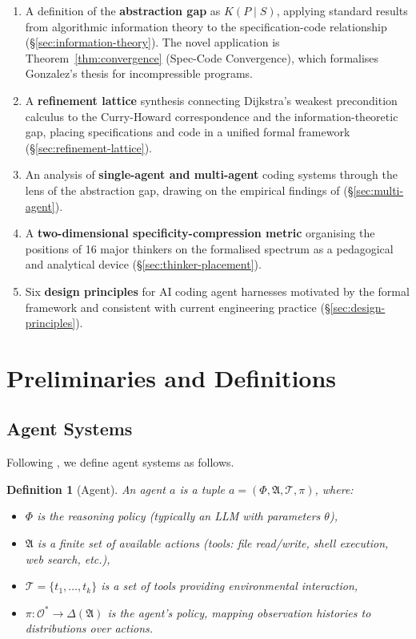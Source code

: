 \documentclass[11pt, a4paper, logo, copyright]{googledeepmind}
\newtheorem{definition}{Definition}[section]
\begin{document}
\begin{enumerate}
    \item A definition of the \textbf{abstraction gap} as $K(P \mid S)$, applying standard results from algorithmic information theory to the specification-code relationship (\S\ref{sec:information-theory}). The novel application is Theorem~\ref{thm:convergence} (Spec-Code Convergence), which formalises Gonzalez's thesis for incompressible programs.
    \item A \textbf{refinement lattice} synthesis connecting Dijkstra's weakest precondition calculus to the Curry-Howard correspondence and the information-theoretic gap, placing specifications and code in a unified formal framework (\S\ref{sec:refinement-lattice}).
    \item An analysis of \textbf{single-agent and multi-agent} coding systems through the lens of the abstraction gap, drawing on the empirical findings of \citet{kim2025scaling} (\S\ref{sec:multi-agent}).
    \item A \textbf{two-dimensional specificity-compression metric} organising the positions of 16 major thinkers on the formalised spectrum as a pedagogical and analytical device (\S\ref{sec:thinker-placement}).
    \item Six \textbf{design principles} for AI coding agent harnesses motivated by the formal framework and consistent with current engineering practice (\S\ref{sec:design-principles}).
\end{enumerate}


\section{Preliminaries and Definitions}
\label{sec:preliminaries}

\subsection{Agent Systems}

Following \citet{kim2025scaling}, we define agent systems as follows.

\begin{definition}[Agent]
An \emph{agent} $a$ is a tuple $a = (\Phi, \mathfrak{A}, \mathcal{T}, \pi)$, where:
\begin{itemize}
    \item $\Phi$ is the \emph{reasoning policy} (typically an LLM with parameters $\theta$),
    \item $\mathfrak{A}$ is a finite set of \emph{available actions} (tools: file read/write, shell execution, web search, etc.),
    \item $\mathcal{T} = \{t_1, \ldots, t_k\}$ is a set of \emph{tools} providing environmental interaction,
    \item $\pi: \mathcal{O}^* \to \Delta(\mathfrak{A})$ is the agent's \emph{policy}, mapping observation histories to distributions over actions.
\end{itemize}
\end{definition}
\end{document}
